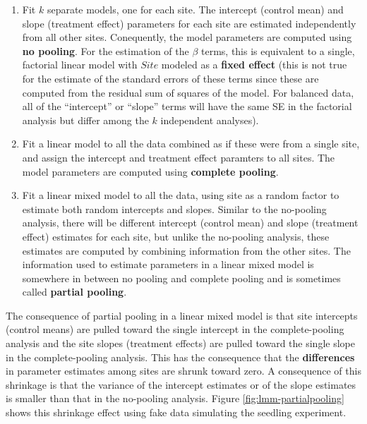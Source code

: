 \documentclass[]{book}
\begin{document}
\begin{enumerate}
\def\labelenumi{\arabic{enumi}.}
\item
  Fit \(k\) separate models, one for each site. The intercept (control
  mean) and slope (treatment effect) parameters for each site are
  estimated independently from all other sites. Conequently, the model
  parameters are computed using \textbf{no pooling}. For the estimation
  of the \(\beta\) terms, this is equivalent to a single, factorial
  linear model with \(Site\) modeled as a \textbf{fixed effect} (this is
  not true for the estimate of the standard errors of these terms since
  these are computed from the residual sum of squares of the model. For
  balanced data, all of the ``intercept'' or ``slope'' terms will have
  the same SE in the factorial analysis but differ among the \(k\)
  independent analyses).
\item
  Fit a linear model to all the data combined as if these were from a
  single site, and assign the intercept and treatment effect paramters
  to all sites. The model parameters are computed using \textbf{complete
  pooling}.
\item
  Fit a linear mixed model to all the data, using site as a random
  factor to estimate both random intercepts and slopes. Similar to the
  no-pooling analysis, there will be different intercept (control mean)
  and slope (treatment effect) estimates for each site, but unlike the
  no-pooling analysis, these estimates are computed by combining
  information from the other sites. The information used to estimate
  parameters in a linear mixed model is somewhere in between no pooling
  and complete pooling and is sometimes called \textbf{partial pooling}.
\end{enumerate}

The consequence of partial pooling in a linear mixed model is that site
intercepts (control means) are pulled toward the single intercept in the
complete-pooling analysis and the site slopes (treatment effects) are
pulled toward the single slope in the complete-pooling analysis. This
has the consequence that the \textbf{differences} in parameter estimates
among sites are shrunk toward zero. A consequence of this shrinkage is
that the variance of the intercept estimates or of the slope estimates
is smaller than that in the no-pooling analysis. Figure
\ref{fig:lmm-partialpooling} shows this shrinkage effect using fake data
simulating the seedling experiment.
\end{document}
